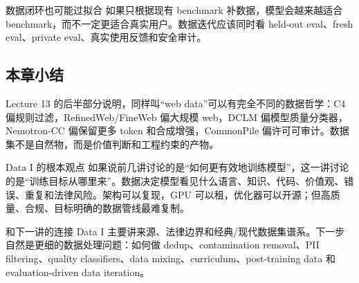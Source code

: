 \begin{warningbox}{数据闭环也可能过拟合}
如果只根据现有 benchmark 补数据，模型会越来越适合 benchmark，而不一定更适合真实用户。数据迭代应该同时看 held-out eval、fresh eval、private eval、真实使用反馈和安全审计。
\end{warningbox}

\subsection{本章小结}

Lecture 13 的后半部分说明，同样叫“web data”可以有完全不同的数据哲学：C4 偏规则过滤，RefinedWeb/FineWeb 偏大规模 web，DCLM 偏模型质量分类器，Nemotron-CC 偏保留更多 token 和合成增强，CommonPile 偏许可可审计。数据集不是自然物，而是价值判断和工程约束的产物。

\begin{importantbox}{Data I 的根本观点}
如果说前几讲讨论的是“如何更有效地训练模型”，这一讲讨论的是“训练目标从哪里来”。数据决定模型看见什么语言、知识、代码、价值观、错误、重复和法律风险。架构可以复现，GPU 可以租，优化器可以开源；但高质量、合规、目标明确的数据管线最难复制。
\end{importantbox}

\begin{knowledgebox}{和下一讲的连接}
Data I 主要讲来源、法律边界和经典/现代数据集谱系。下一步自然是更细的数据处理问题：如何做 dedup、contamination removal、PII filtering、quality classifiers、data mixing、curriculum、post-training data 和 evaluation-driven data iteration。
\end{knowledgebox}

